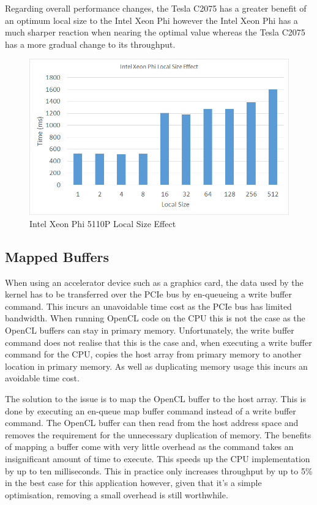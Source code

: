 Regarding overall performance changes, the Tesla C2075 has a greater benefit of
an optimum local size to the Intel Xeon Phi however the Intel Xeon Phi has a
much sharper reaction when nearing the optimal value whereas the Tesla C2075 has
a more gradual change to its throughput.

\begin{figure}[H]
\includegraphics[width=\linewidth]{images/phiLocalSize.png}
\caption{Intel Xeon Phi 5110P Local Size Effect}
\label{fig:phiLocalSize}
\end{figure}

\subsection{Mapped Buffers}
\label{sec:mappedBuffers}

When using an accelerator device such as a graphics card, the data used by the
kernel has to be transferred over the PCIe bus by en-queueing a write buffer
command. This incurs an unavoidable time cost as the PCIe bus has limited
bandwidth. When running OpenCL code on the CPU this is not the case as the
OpenCL buffers can stay in primary memory. Unfortunately, the write buffer
command does not realise that this is the case and, when executing a write
buffer command for the CPU, copies the host array from primary memory to another
location in primary memory. As well as duplicating memory usage this incurs an
avoidable time cost.

The solution to the issue is to map the OpenCL buffer to the host array. This is
done by executing an en-queue map buffer command instead of a write buffer
command. The OpenCL buffer can then read from the host address space and removes
the requirement for the unnecessary duplication of memory. The benefits of
mapping a buffer come with very little overhead as the command takes an
insignificant amount of time to execute. This speeds up the CPU implementation
by up to ten milliseconds. This in practice only increases throughput by up to
5\% in the best case for this application however, given that it's a simple
optimisation, removing a small overhead is still worthwhile.
